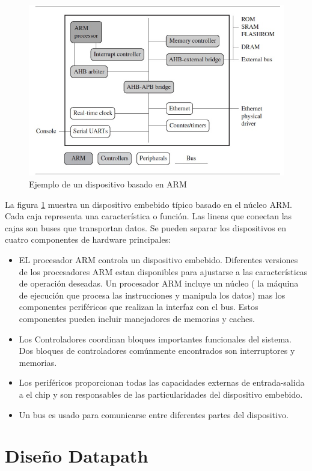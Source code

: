 \documentclass[12pt]{book}
\theoremstyle{definition}
\theoremstyle{remark}
\theoremstyle{plain}
\begin{document}
\begin{figure}
\centering
\includegraphics[width=5in]{Microcontroller.jpg}
\caption{Ejemplo de un dispositivo basado en ARM}
\label{fig4}
\end{figure}

La figura \ref{fig4} muestra un dispositivo embebido típico basado en el núcleo ARM. Cada caja representa una característica o función. Las lineas que conectan las cajas son buses que transportan datos. Se pueden separar los dispositivos en cuatro componentes de hardware principales:
\begin{itemize}
\item EL procesador ARM controla un dispositivo embebido. Diferentes versiones de los procesadores ARM estan disponibles para ajustarse a las características de operación deseadas. Un procesador ARM incluye un núcleo ( la máquina de ejecución que procesa las instrucciones y manipula los datos) mas los componentes periféricos que realizan la interfaz con el bus. Estos componentes pueden incluir manejadores de memorias y caches.

\item Los Controladores coordinan bloques importantes funcionales del sistema. Dos bloques de controladores comúnmente encontrados son interruptores y memorias.
\item Los periféricos proporcionan todas las capacidades externas de entrada-salida a el chip y son responsables de las particularidades del dispositivo embebido.
\item Un bus es usado para comunicarse entre diferentes partes del dispositivo.
\end{itemize}


\chapter{Diseño Datapath}
\end{document}
